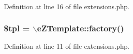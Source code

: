 Definition at line 16 of file extensions.\-php.

\hypertarget{extensions_8php_a04b1944cdb09f9a4e290cde7a12499e6}{
\subsubsection[{\$tpl}]{\setlength{\rightskip}{0pt plus 5cm}\$tpl = $\backslash$e\-Z\-Template\-::factory()}}\label{extensions_8php_a04b1944cdb09f9a4e290cde7a12499e6}


Definition at line 11 of file extensions.\-php.

